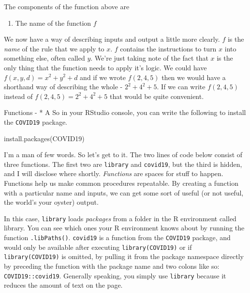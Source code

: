\documentclass[
]{book}
\newenvironment{Shaded}{\begin{snugshade}}{\end{snugshade}}
\newcommand{\FunctionTok}[1]{\textcolor[rgb]{0.00,0.00,0.00}{#1}}
\newcommand{\NormalTok}[1]{#1}
\newcommand{\StringTok}[1]{\textcolor[rgb]{0.31,0.60,0.02}{#1}}
\providecommand{\tightlist}{%
  \setlength{\itemsep}{0pt}\setlength{\parskip}{0pt}}
\begin{document}
The components of the function above are

\begin{enumerate}
\def\labelenumi{\arabic{enumi}.}
\tightlist
\item
  The name of the function \(f\)
\end{enumerate}

We now have a way of describing inputs and output a little more clearly. \(f\) is the \emph{name} of the rule that we apply to \(x\). \(f\) contains the instructions to turn \(x\) into something else, often called \(y\). We're just taking note of the fact that \(x\) is the only thing that the function needs to apply it's logic. We could have \(f(x, y, d)= x^2 + y^2 + d\) and if we wrote \(f(2, 4, 5)\) then we would have a shorthand way of describing the whole - \(2^2+4^2+5\). If we can write \(f(2, 4, 5)\) instead of \(f(2, 4, 5)=2^2+4^2+5\) that would be quite convenient.

Functions - * A So in your RStudio console, you can write the following to install the \texttt{COVID19} package.

\begin{Shaded}
\begin{Highlighting}[]
\FunctionTok{install.packages}\NormalTok{(}\StringTok{\textquotesingle{}COVID19\textquotesingle{}}\NormalTok{)}
\end{Highlighting}
\end{Shaded}

I'm a man of few words. So let's get to it. The two lines of code below consist of three functions. The first two are \texttt{library} and \texttt{covid19}, but the third is hidden, and I will disclose where shortly. \emph{Functions} are spaces for stuff to happen. Functions help us make common procedures repeatable. By creating a function with a particular name and inputs, we can get some sort of useful (or not useful, the world's your oyster) output.

In this case, \texttt{library} loads \emph{packages} from a folder in the R environment called library. You can see which ones your R environment knows about by running the function \texttt{.libPaths()}. \texttt{covid19} is a function from the \texttt{COVID19} package, and would only be available after executing \texttt{library(COVID19)} or if \texttt{library(COVID19)} is omitted, by pulling it from the package namespace directly by preceding the function with the package name and two colons like so: \texttt{COVID19::covid19}. Generally speaking, you simply use \texttt{library} because it reduces the amount of text on the page.
\end{document}
